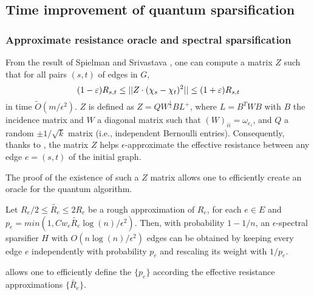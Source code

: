 \subsection{Time improvement of quantum sparsification}


\subsubsection{Approximate resistance oracle and spectral sparsification}

From the result of Spielman and Srivastava \cite{spielman_graph_2011}, 
one can compute a matrix $Z$ such that for all pairs $(s,t)$ of edges in $G$,
\begin{equation}\label{eq:matrix-z}
    (1-\varepsilon) R_{s,t} \leq || Z\cdot(\chi_s-\chi_t)^2 || \leq (1+\varepsilon) R_{s,t}
\end{equation}
in time $\tilde{O}(m/\epsilon^2)$. $Z$ is defined as $Z = QW^{\frac{1}{2}}BL^+$, 
where $L=B^TWB$ with $B$ the incidence matrix and $W$ a diagonal matrix 
such that $(W)_{ii} = \omega_{e_i}$, and $Q$ a random $\pm 1/\sqrt k$ matrix 
(i.e., independent Bernoulli entries). Consequently, thanks to , 
the matrix $Z$ helps $\epsilon$-approximate the effective resistance between any edge $e = (s,t)$ 
of the initial graph.

The proof of the existence of such a $Z$ matrix allows one to
efficiently create an oracle for the quantum algorithm.


\begin{theorem} \label{th:app-resistance-oracle} 
Let $R_e/2 \leq \tilde{R_e} \leq 2R_e$ be a rough approximation of $R_e$,  
for each $e\in E$ and $p_e = min(1,Cw_e\tilde{R_e}\log(n)/\epsilon^2)$. Then, 
with probability $1-1/n$, an $\epsilon$-spectral sparsifier $H$
with $O(n\log(n)/\epsilon^2)$ edges can be obtained by keeping every edge $e$
independently with probability $p_e$ and rescaling its weight with $1/p_e$.
\end{theorem}

 allows one to efficiently define the $\{p_e\}$ according the effective resistance approximations $\{\tilde {R_e}\}$.


